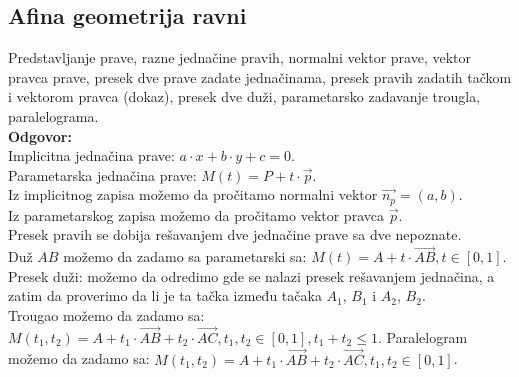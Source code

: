 \documentclass[12pt]{article}
\begin{document}
    \subsection{Afina geometrija ravni}
    Predstavljanje prave, razne jednačine pravih, normalni
    vektor prave, vektor pravca prave, presek dve prave zadate
    jednačinama, presek pravih zadatih tačkom i vektorom pravca
    (dokaz), presek dve duži, parametarsko zadavanje trougla,
    paralelograma.
    \\
    \textbf{Odgovor:}\\
    Implicitna jednačina prave: $a\cdot x+b\cdot y + c = 0$.\\
    Parametarska jednačina prave: $M(t)=P+t\cdot \overrightarrow{p}$.\\
    Iz implicitnog zapisa možemo da pročitamo normalni vektor $\overrightarrow{n_p}=(a,b)$.\\
    Iz parametarskog zapisa možemo da pročitamo vektor pravca $\overrightarrow{p}$.\\
    Presek pravih se dobija rešavanjem dve jednačine prave sa dve nepoznate.\\
    Duž $AB$ možemo da zadamo sa parametarski sa: $M(t)=A+t\cdot \overrightarrow{AB}, t\in[0,1]$.\\
    Presek duži: možemo da odredimo gde se nalazi presek rešavanjem jednačina,
    a zatim da proverimo da li je ta tačka između tačaka $A_1$, $B_1$ i $A_2$, $B_2$.\\
    Trougao možemo da zadamo sa: $M(t_1,t_2)=A+t_1\cdot \overrightarrow{AB}+t_2\cdot \overrightarrow{AC}, t_1, t_2\in[0,1], t_1+t_2\leq1$.
    Paralelogram možemo da zadamo sa: $M(t_1,t_2)=A+t_1\cdot \overrightarrow{AB}+t_2\cdot \overrightarrow{AC}, t_1, t_2\in[0,1]$.
    \par
\end{document}

